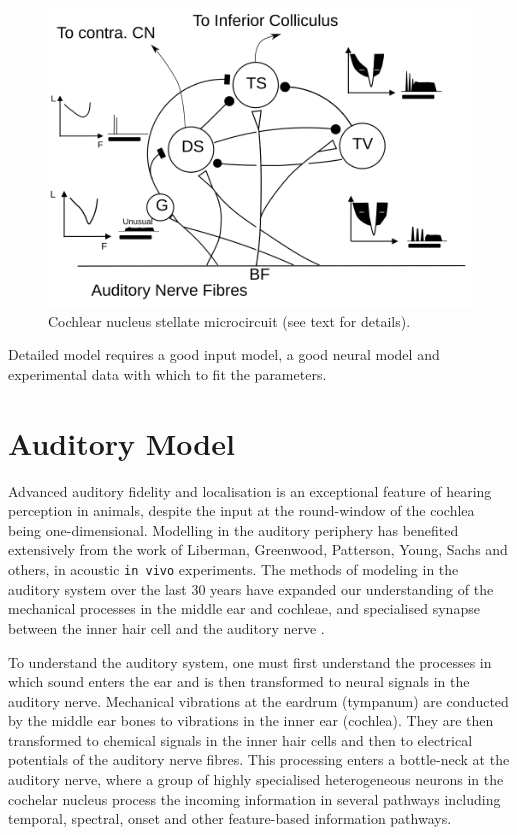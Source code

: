 \begin{figure}[htb]
  \centering
  \includegraphics[width=\textwidth]{gfx/CNcircuit}
  \caption{Cochlear nucleus stellate microcircuit (see text for details). }
  \label{fig:microcircuit}
\end{figure}


\medskip{}

Detailed model requires a good input model, a good neural model and
experimental data with which to fit the parameters.  


\section{Auditory Model}



Advanced auditory fidelity and localisation is an exceptional feature
of hearing perception in animals, despite the input at the
round-window of the cochlea being one-dimensional.  Modelling in the
auditory periphery has benefited extensively from the work of
Liberman, Greenwood, Patterson, Young, Sachs and others, in acoustic
\texttt{in vivo} experiments. The methods of modeling in the auditory
system over the last 30 years have expanded our understanding of the
mechanical processes in the middle ear and cochleae, and specialised
synapse between the inner hair cell and the auditory nerve
\citep{DavisVoigt:1991,Carney:1993,MeddisHewittEtAl:1990}.


To understand the auditory system, one must first understand the
processes in which sound enters the ear and is then transformed to
neural signals in the auditory nerve. Mechanical vibrations at the
eardrum (tympanum) are conducted by the middle ear bones to vibrations
in the inner ear (cochlea). They are then transformed to chemical
signals in the inner hair cells and then to electrical potentials of
the auditory nerve fibres. This processing enters a bottle-neck at the
auditory nerve, where a group of highly specialised heterogeneous
neurons in the cochelar nucleus process the incoming information in
several pathways including temporal, spectral, onset and
other feature-based information pathways.

